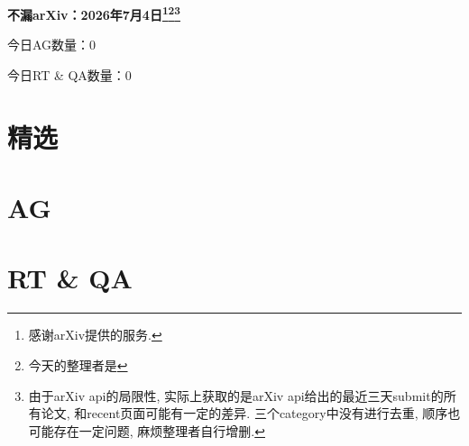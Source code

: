 \documentclass[9pt, a4paper]{article}
\theoremstyle{plain}
\theoremstyle{definition}
\theoremstyle{remark}
\newcommand{\AGnumber}{0}
\newcommand{\RTQAnumber}{0}
\newcommand{\NewestDate}{2026年7月4日}
\newcommand{\todayarXiver}{} %
\begin{document}
\begin{center}
    \Huge\textbf{不漏arXiv：\NewestDate\footnote{感谢arXiv提供的服务.}\footnote{今天的整理者是\todayarXiver}\footnote{由于arXiv api的局限性, 实际上获取的是arXiv api给出的最近三天submit的所有论文, 和recent页面可能有一定的差异. 三个category中没有进行去重, 顺序也可能存在一定问题, 麻烦整理者自行增删.}} \\
\end{center}

\setcounter{section}{-1}

\begin{center}
    今日AG数量：\AGnumber
    
    今日RT \& QA数量：\RTQAnumber
    
\end{center}


\section{精选}


\section{AG}

\section{RT \& QA}
\end{document}
